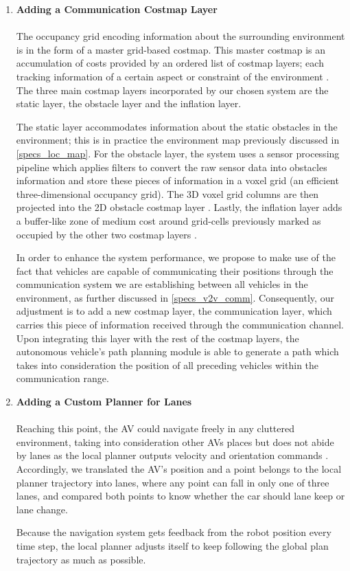 \begin{enumerate}
\item \textbf{Adding a Communication Costmap Layer} 
\label{specs_costmap}
\\ \\
The occupancy grid encoding information about the surrounding environment is in the form of a master grid-based costmap. This master costmap is an accumulation of costs provided by an ordered list of costmap layers; each tracking information of a certain aspect or constraint of the environment \cite{costmap}. The three main costmap layers incorporated by our chosen system are the static layer, the obstacle layer and the inflation layer. 

The static layer accommodates information about the static obstacles in the environment; this is in practice the environment map previously discussed in \ref{specs_loc_map}. For the obstacle layer, the system uses a sensor processing pipeline which applies filters to convert the raw sensor data into obstacles information and store these pieces of information in a voxel grid (an efficient three-dimensional occupancy grid). The 3D voxel grid columns are then projected into the 2D obstacle costmap layer \cite{tbd}. Lastly, the inflation layer adds a buffer-like zone of medium cost around grid-cells previously marked as occupied by the other two costmap layers \cite{costmap}. 

In order to enhance the system performance, we propose to make use of the fact that vehicles are capable of communicating their positions through the communication system we are establishing between all vehicles in the environment, as further discussed in \ref{specs_v2v_comm}. Consequently, our adjustment is to add a new costmap layer, the communication layer, which carries this piece of information received through the communication channel. Upon integrating this layer with the rest of the costmap layers, the autonomous vehicle’s path planning module is able to generate a path which takes into consideration the position of all preceding vehicles within the communication range.

\item \textbf{Adding a Custom Planner for Lanes} 
\label{specs_custom_planner}
\\ \\
Reaching this point, the AV could navigate freely in any cluttered environment, taking into consideration other AVs places but does not abide by lanes as the local planner outputs velocity and orientation commands \cite{tbd}. Accordingly, we translated the AV's position and a point belongs to the local planner trajectory into lanes, where any point can fall in only one of three lanes, and compared both points to know whether the car should lane keep or lane change. 

Because the navigation system gets feedback from the robot position every time step, the local planner adjusts itself to keep following the global plan trajectory as much as possible. 
\end{enumerate}

